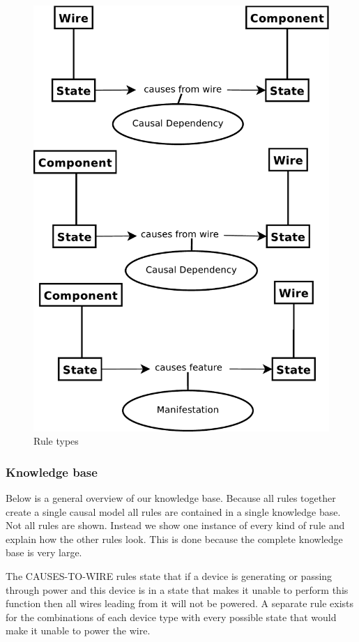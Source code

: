 \begin{figure}[htbp]
	\centering
	\includegraphics[width=1.00\textwidth]{rule-types.pdf}
	\caption{Rule types}
	\label{fig:IS}
\end{figure}

\subsubsection{Knowledge base}
Below is a general overview of our knowledge base. Because all rules together create a single causal model all rules are contained in a single knowledge base. Not all rules are shown. Instead we show one instance of every kind of rule and explain how the other rules look. This is done because the complete knowledge base is very large.

The CAUSES-TO-WIRE rules state that if a device is generating or passing through power and this device is in a state that makes it unable to perform this function then all wires leading from it will not be powered. A separate rule exists for the combinations of each device type with every possible state that would make it unable to power the wire.

